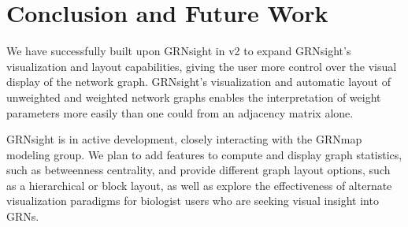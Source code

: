 \documentclass[sigconf,review]{acmart}
\begin{document}
\section{Conclusion and Future Work}
We have successfully built upon GRNsight in v2 to expand GRNsight's visualization and layout capabilities, giving the user more control over the visual display of the network graph. GRNsight's visualization and automatic layout of unweighted and weighted network graphs enables the interpretation of weight parameters more easily than one could from an adjacency matrix alone.

GRNsight is in active development, closely interacting with the GRNmap modeling group. We plan to add features to compute and display graph statistics, such as betweenness centrality, and provide different graph layout options, such as a hierarchical or block layout, as well as explore the effectiveness of alternate visualization paradigms for biologist users who are seeking visual insight into GRNs.



\end{document}
